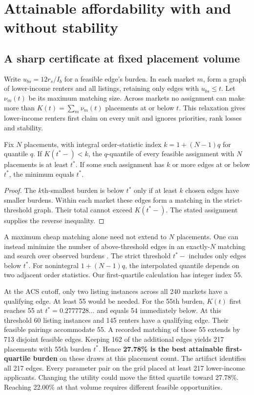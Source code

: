 \section{Attainable affordability with and without stability}\label{sec:burden}
\subsection{A sharp certificate at fixed placement volume}
Write $u_{bs}=12r_s/I_b$ for a feasible edge's burden. In each market $m$, form a graph of lower-income renters and all listings, retaining only edges with $u_{bs}\leq t$. Let $\nu_m(t)$ be its maximum matching size. Across markets no assignment can make more than $K(t)=\sum_m\nu_m(t)$ placements at or below $t$. This relaxation gives lower-income renters first claim on every unit and ignores priorities, rank losses and stability.

\begin{proposition}\label{prop:burden}
Fix $N$ placements, with integral order-statistic index $k=1+(N-1)q$ for quantile $q$. If $K(t^*{-})<k$, the $q$-quantile of every feasible assignment with $N$ placements is at least $t^*$. If some such assignment has $k$ or more edges at or below $t^*$, the minimum equals $t^*$.
\end{proposition}
\begin{proof}
The $k$th-smallest burden is below $t^*$ only if at least $k$ chosen edges have smaller burdens. Within each market these edges form a matching in the strict-threshold graph. Their total cannot exceed $K(t^*{-})$. The stated assignment supplies the reverse inequality.
\end{proof}
A maximum cheap matching alone need not extend to $N$ placements. One can instead minimize the number of above-threshold edges in an exactly-$N$ matching and search over observed burdens \cite{gorski2009}. The strict threshold $t^*{-}$ includes only edges below $t^*$. For nonintegral $1+(N-1)q$, the interpolated quantile depends on two adjacent order statistics. Our first-quartile calculation has integer index 55.

At the ACS cutoff, only two listing instances across all 240 markets have a qualifying edge. At least 55 would be needed. For the 55th burden, $K(t)$ first reaches 55 at $t^*=0.2777728\ldots$ and equals 54 immediately below. At this threshold 60 listing instances and 145 renters have a qualifying edge. Their feasible pairings accommodate 55. A recorded matching of those 55 extends by 713 disjoint feasible edges. Keeping 162 of the additional edges yields 217 placements with 55th burden $t^*$. Hence \textbf{27.78\% is the best attainable first-quartile burden} on these draws at this placement count. The artifact identifies all 217 edges. Every parameter pair on the grid placed at least 217 lower-income applicants. Changing the utility could move the fitted quartile toward 27.78\%. Reaching 22.00\% at that volume requires different feasible opportunities.

